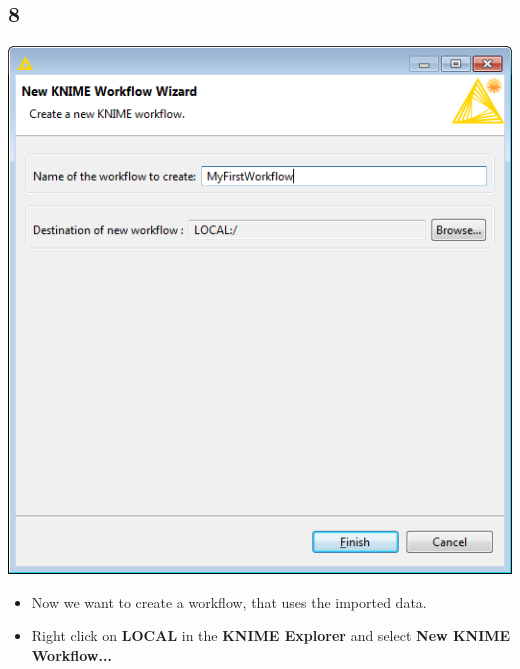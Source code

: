 \documentclass{beamer}
\begin{document}
\subsection{8}
\begin{frame}
	\begin{center}
  		\includegraphics[height=0.6\textheight]{8.png}
	\end{center}
	\begin{itemize}
		\item Now we want to create a workflow, that uses the imported data.
		\item Right click on \textbf{LOCAL} in the \textbf{KNIME Explorer} and select \textbf{New KNIME Workflow...}
	\end{itemize}
\end{frame}
\end{document}
